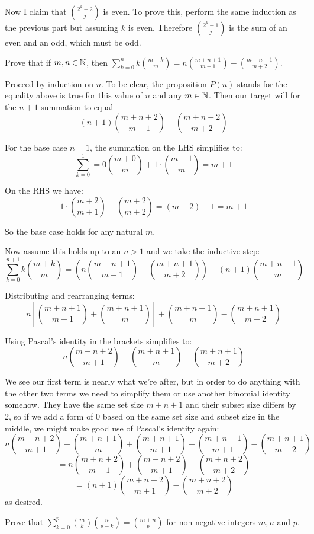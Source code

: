 \documentclass{article}
\begin{document}
Now I claim that $\binom{2^k - 2}{j}$ is even. To prove this, perform the same induction as the previous part but assuming $k$ is even. Therefore $\binom{2^k - 1}{j}$ is the sum of an even and an odd, which must be odd.

\begin{problem}
Prove that if $m, n \in \mathbb{N}$, then $\sum\limits_{k=0}^{n} k\binom{m+k}{m} = n\binom{m + n + 1}{m+1} - \binom{m + n + 1}{m+2}$.
\end{problem}

Proceed by induction on $n$. To be clear, the proposition $P(n)$ stands for the equality above is true for this value of $n$ and any $m \in \mathbb{N}$. Then our target will for the $n+1$ summation to equal
$$(n+1)\binom{m+n+2}{m+1} - \binom{m+n+2}{m+2}$$

For the base case $n = 1$, the summation on the LHS simplifies to:
$$\sum_{k=0}^1 = 0\binom{m+0}{m} + 1\cdot \binom{m+1}{m} = m + 1$$

On the RHS we have:
$$1\cdot\binom{m + 2}{m+1} - \binom{m + 2}{m + 2} = (m + 2) - 1 = m + 1$$

So the base case holds for any natural $m$.

Now assume this holds up to an $n > 1$ and we take the inductive step:
$$\sum_{k=0}^{n+1} k\binom{m+k}{m} = \left(n\binom{m+n+1}{m+1} - \binom{m+n+1}{m+2}\right) + (n + 1)\binom{m+n+1}{m}$$

Distributing and rearranging terms:
$$n\left[\binom{m+n+1}{m+1} + \binom{m+n+1}{m}\right] + \binom{m+n+1}{m} - \binom{m+n+1}{m+2}$$

Using Pascal's identity in the brackets simplifies to:
$$n\binom{m+n+2}{m+1} + \binom{m+n+1}{m} - \binom{m+n+1}{m+2}$$

We see our first term is nearly what we're after, but in order to do anything with the other two terms we need to simplify them or use another binomial identity somehow. They have the same set size $m +n+1$ and their subset size differs by 2, so if we add a form of 0 based on the same set size and subset size in the middle, we might make good use of Pascal's identity again:
$$n\binom{m+n+2}{m+1} + \binom{m+n+1}{m} + \binom{m+n+1}{m+1} - \binom{m+n+1}{m+1} - \binom{m+n+1}{m+2}$$
$$=n\binom{m+n+2}{m+1} + \binom{m+n+2}{m+1} - \binom{m+n+2}{m+2}$$
$$=(n+1)\binom{m+n+2}{m+1} - \binom{m+n+2}{m+2}$$
as desired.

\begin{problem}
Prove that $\sum\limits_{k=0}^p \binom{m}{k}\binom{n}{p-k} = \binom{m+n}{p}$ for non-negative integers $m, n$ and $p$.
\end{problem}
\end{document}

